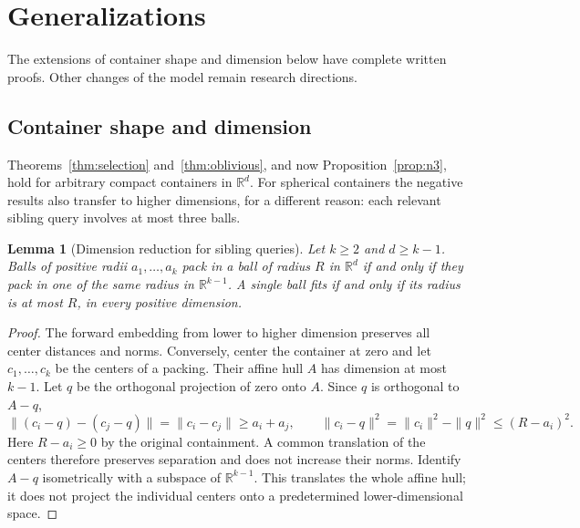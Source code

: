 \documentclass[11pt]{article}
\newtheorem{lemma}[theorem]{Lemma}
\theoremstyle{definition}
\newcommand{\R}{\mathbb{R}}
\begin{document}
\section{Generalizations}\label{sec:general}

The extensions of container shape and dimension below have complete
written proofs. Other changes of the model remain research directions.
\subsection{Container shape and dimension}\label{sec:dimension}

Theorems~\ref{thm:selection} and~\ref{thm:oblivious}, and now
Proposition~\ref{prop:n3}, hold for arbitrary compact containers in
$\R^d$. For spherical containers the negative results also transfer
to higher dimensions, for a different reason: each relevant sibling
query involves at most three balls.

\begin{lemma}[Dimension reduction for sibling queries]\label{lem:dimreduce}
Let $k\ge2$ and $d\ge k-1$. Balls of positive radii $a_1,\ldots,a_k$
pack in a ball of radius $R$ in $\R^d$ if and only if they pack in
one of the same radius in $\R^{k-1}$. A single ball fits if and only
if its radius is at most $R$, in every positive dimension.
\end{lemma}
\begin{proof}
The forward embedding from lower to higher dimension preserves all
center distances and norms. Conversely, center the container at zero
and let $c_1,\ldots,c_k$ be the centers of a packing. Their affine hull
$A$ has dimension at most $k-1$. Let $q$ be the orthogonal projection
of zero onto $A$. Since $q$ is orthogonal to $A-q$,
\[
 \|(c_i-q)-(c_j-q)\|=\|c_i-c_j\|\ge a_i+a_j,
 \qquad \|c_i-q\|^2=\|c_i\|^2-\|q\|^2\le(R-a_i)^2.
\]
Here $R-a_i\ge0$ by the original containment. A common translation
of the centers therefore preserves separation and does not increase
their norms. Identify $A-q$ isometrically with a subspace of
$\R^{k-1}$. This translates the whole affine hull; it does not project
the individual centers onto a predetermined lower-dimensional space.
\end{proof}
\end{document}
